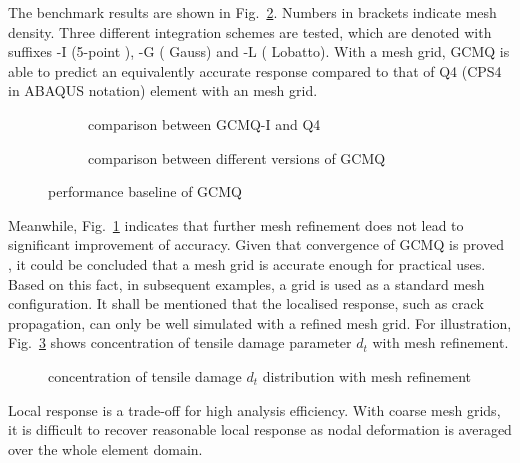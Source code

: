 \documentclass[3p,review,sort&compress,11pt,fleqn]{elsarticle}
\newcommand*{\figref}[1]{Fig.~\ref{#1}}
\begin{document}
The benchmark results are shown in \figref{fig:single_patch}. Numbers in brackets indicate mesh density. Three different integration schemes are tested, which are denoted with suffixes -I (5-point \citep{Irons1971}), -G ( Gauss) and -L ( Lobatto). With a  mesh grid, GCMQ is able to predict an equivalently accurate response compared to that of Q4 (CPS4 in ABAQUS notation) element \citep{Taig1964} with an  mesh grid.
\begin{figure}[htb]
\scriptsize\centering
\begin{subfigure}[b]{.48\textwidth}

\caption{comparison between GCMQ-I and Q4}
\end{subfigure}\quad
\begin{subfigure}[b]{.48\textwidth}

\caption{comparison between different versions of GCMQ}\label{fig:gcmq_scheme}
\end{subfigure}
\caption{performance baseline of GCMQ}\label{fig:single_patch}
\end{figure}
Meanwhile, \figref{fig:gcmq_scheme} indicates that further mesh refinement does not lead to significant improvement of accuracy. Given that convergence of GCMQ is proved \citep{Chang2019}, it could be concluded that a  mesh grid is accurate enough for practical uses. Based on this fact, in subsequent examples, a  grid is used as a standard mesh configuration. It shall be mentioned that the localised response, such as crack propagation, can only be well simulated with a refined mesh grid. For illustration, \figref{fig:single_patch_dt} shows concentration of tensile damage parameter $d_t$ with mesh refinement.
\begin{figure}[htb]
\scriptsize\centering

\caption{concentration of tensile damage $d_t$ distribution with mesh refinement}\label{fig:single_patch_dt}
\end{figure}
Local response is a trade-off for high analysis efficiency. With coarse mesh grids, it is difficult to recover reasonable local response as nodal deformation is averaged over the whole element domain.
\end{document}
